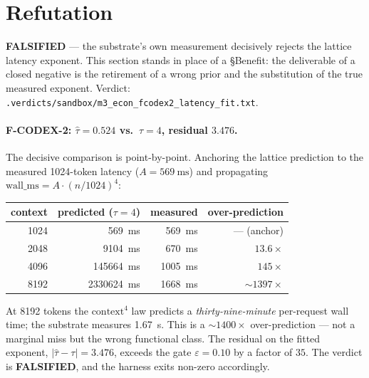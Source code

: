 \documentclass[11pt,a4paper]{article}
\newcommand{\red}[1]{\textcolor{red!70!black}{\textbf{#1}}}
\newcommand{\ctx}{\ensuremath{n}}
\newcommand{\taum}{\ensuremath{\hat{\tau}}}
\begin{document}
\section{Refutation}
\label{sec:refute}
\red{FALSIFIED} --- the substrate's own measurement decisively rejects the
lattice latency exponent. This section stands in place of a \S Benefit: the
deliverable of a closed negative is the retirement of a wrong prior and the
substitution of the true measured exponent. Verdict:
\texttt{.verdicts/sandbox/m3\_econ\_fcodex2\_latency\_fit.txt}.

\paragraph{F-CODEX-2: \(\taum = 0.524\) vs.\ \(\tau = 4\), residual \(3.476\).}
The decisive comparison is point-by-point. Anchoring the lattice prediction to
the measured \num{1024}-token latency (\(A = \SI{569}{\milli\second}\)) and
propagating \(\mathrm{wall\_ms} = A\cdot(\ctx/1024)^4\):
\begin{center}
\begin{tabular}{rrrr}
\toprule
context & predicted (\(\tau{=}4\)) & measured & over-prediction \\
\midrule
1024 & \SI{569}{\milli\second}     & \SI{569}{\milli\second}  & --- (anchor) \\
2048 & \SI{9104}{\milli\second}    & \SI{670}{\milli\second}  & \(13.6\times\) \\
4096 & \SI{145664}{\milli\second}  & \SI{1005}{\milli\second} & \(145\times\) \\
8192 & \SI{2330624}{\milli\second} & \SI{1668}{\milli\second} & \(\sim\!1397\times\) \\
\bottomrule
\end{tabular}
\end{center}
\noindent At \num{8192} tokens the \(\mathrm{context}^4\) law predicts a
\emph{thirty-nine-minute} per-request wall time; the substrate measures
\SI{1.67}{\second}. This is a \(\sim\!1400\times\) over-prediction --- not a
marginal miss but the wrong functional class. The residual on the fitted
exponent, \(|\taum - \tau| = 3.476\), exceeds the gate \(\varepsilon = 0.10\) by
a factor of \(35\). The verdict is \red{FALSIFIED}, and the harness exits
non-zero accordingly.
\end{document}
